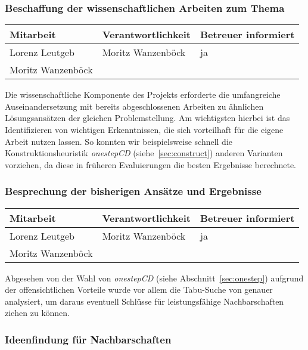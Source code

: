 \subsubsection{ Beschaffung der wissenschaftlichen Arbeiten zum Thema}

\begin{center}
\begin{tabular}{lll}
	Mitarbeit & Verantwortlichkeit & Betreuer informiert \\
	\hline
	Lorenz Leutgeb & Moritz Wanzenböck & ja \\
	Moritz Wanzenböck & & \\
\end{tabular}
\end{center}

Die wissenschaftliche Komponente des Projekts erforderte die umfangreiche Auseinandersetzung mit bereits abgeschlossenen Arbeiten zu ähnlichen Lösungsansätzen der gleichen Pro\-blem\-stel\-lung. Am wichtigsten hierbei ist das Identifizieren von wichtigen Erkenntnissen, die sich vorteilhaft für die eigene Arbeit nutzen lassen. So konnten wir beispielsweise schnell die Konstruktionsheuristik \emph{onestepCD} (siehe~\ref{sec:construct}) anderen Varianten vorziehen, da diese in früheren Evaluierungen die besten Ergebnisse berechnete.

\subsubsection{ Besprechung der bisherigen Ansätze und Ergebnisse}

\begin{center}
\begin{tabular}{lll}
	Mitarbeit & Verantwortlichkeit & Betreuer informiert \\
	\hline
	Lorenz Leutgeb & Moritz Wanzenböck & ja \\
	Moritz Wanzenböck & & \\
\end{tabular}
\end{center}

Abgesehen von der Wahl von \emph{onestepCD} (siehe Abschnitt~\ref{sec:onestep}) aufgrund der offensichtlichen Vorteile wurde vor allem die Tabu-Suche von \citet*{Noronha2006} genauer analysiert, um daraus eventuell Schlüsse für leistungsfähige Nachbarschaften ziehen zu können.

\subsubsection{ Ideenfindung für Nachbarschaften}

